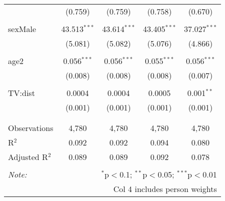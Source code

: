 \begin{table}[!htbp]
\begin{tabular}{@{\extracolsep{-5pt}}lcccc}
  & (0.759) & (0.759) & (0.758) & (0.670) \\ 
  & & & & \\ 
 sexMale & 43.513$^{***}$ & 43.614$^{***}$ & 43.405$^{***}$ & 37.027$^{***}$ \\ 
  & (5.081) & (5.082) & (5.076) & (4.866) \\ 
  & & & & \\ 
 age2 & 0.056$^{***}$ & 0.056$^{***}$ & 0.055$^{***}$ & 0.056$^{***}$ \\ 
  & (0.008) & (0.008) & (0.008) & (0.007) \\ 
  & & & & \\ 
 TV:dist & 0.0004 & 0.0004 & 0.0005 & 0.001$^{**}$ \\ 
  & (0.001) & (0.001) & (0.001) & (0.001) \\ 
  & & & & \\ 
\hline \\[-1.8ex] 
Observations & 4,780 & 4,780 & 4,780 & 4,780 \\ 
R$^{2}$ & 0.092 & 0.092 & 0.094 & 0.080 \\ 
Adjusted R$^{2}$ & 0.089 & 0.089 & 0.092 & 0.078 \\ 
\hline 
\hline \\[-1.8ex] 
\textit{Note:}  & \multicolumn{4}{r}{$^{*}$p$<$0.1; $^{**}$p$<$0.05; $^{***}$p$<$0.01} \\ 
 & \multicolumn{4}{r}{Col 4 includes person weights} \\ 
\end{tabular} 
\end{table} 
